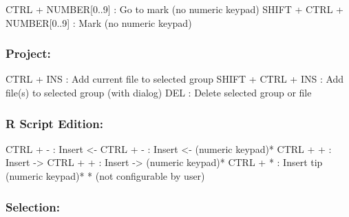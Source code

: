 \vspace{-0.5cm}
\begin{Rtables}[caption={[Marks and go to marks keyboard shortcuts]
    Marks and go to marks keyboard shortcuts},
  label=hotkey:marks]
  CTRL  + NUMBER[0..9]        : Go to mark (no numeric keypad)
  SHIFT + CTRL + NUMBER[0..9] : Mark (no numeric keypad)
\end{Rtables}


\subsubsection{Project:}

\vspace{-0.5cm}
\begin{Rtables}[caption={[Project keyboard shortcuts]
    Project keyboard shortcuts},
  label=hotkey:project]
  CTRL  + INS        : Add current file to selected group
  SHIFT + CTRL + INS : Add file(s) to selected group (with dialog)
  DEL                : Delete selected group or file
\end{Rtables}


\subsubsection{R Script Edition:}

\vspace{-0.5cm}
\begin{Rtables}[caption={[R script edition keyboard shortcuts]
    R script edition keyboard shortcuts},
  label=hotkey:rscript]
  CTRL + - : Insert <-
  CTRL + - : Insert <-  (numeric keypad)*
  CTRL + + : Insert ->
  CTRL + + : Insert ->  (numeric keypad)*
  CTRL + * : Insert tip (numeric keypad)*
  * (not configurable by user)
\end{Rtables}


\newpage
\subsubsection{Selection:}

